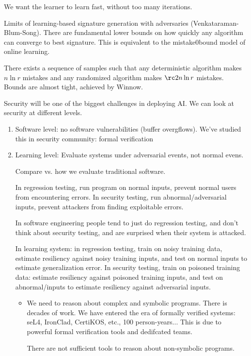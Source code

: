 We want the learner to learn fast, without too many iterations. 

Limits of learning-based signature generation with adversaries (Venkataraman-Blum-Song).  There are fundamental lower bounds on how quickly any algorithm can converge to best signature. This is equivalent to the mistake0bound model of online learning. 

There exists a  sequence of samples such that any deterministic algorithm makes $n\ln r$ mistakes and any randomized algorithm makes $\rc2 n\ln r$ mistakes. Bounds are almost tight, achieved by Winnow.

Security will be one of the biggest challenges in deploying AI.  We can look at security at different levels.
\begin{enumerate}
\item
Software level: no software vulnerabilities (buffer overgflows). We've studied this in security community: formal verification
\item
Learning level: Evaluate systems under adversarial events, not normal evens. 

Compare vs. how we evaluate traditional software. 

In regression testing, run program on normal inputs, prevent normal users from encountering errors. In security testing, run abnormal/adversarial inputs, prevent attackers from finding exploitable errors.

In software engineering people tend to just do regression testing, and don't think about security testing, and are surprised when their system is attacked.

In learning system: in regression testing, train on noisy training data, estimate resiliency against noisy training inputs, and test on normal inputs to estimate generalization error.
In security testing, train on poisoned training data: estimate resiliency against poisoned training inputs, and test on abnormal/inputs to estimate resiliency against adversarial inputs.

\begin{itemize}
\item
We need to reason about complex and symbolic programs. There is decades of work. We have entered the era of formally verified systems: seL4, IronClad, CertiKOS, etc., 100 person-years... This is due to powerful formal verification tools and dedifcated teams.

There are not sufficient tools to reason about non-symbolic programs.


\end{itemize}
\end{enumerate}
